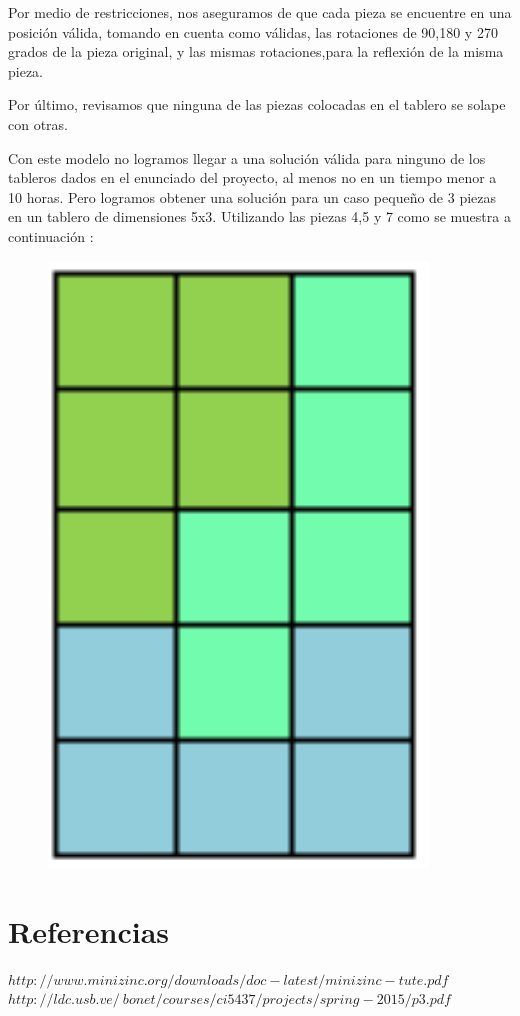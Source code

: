 \documentclass{article}
\begin{document}
Por medio de restricciones, nos aseguramos de que cada pieza se encuentre en una posición válida, tomando en cuenta como válidas, las rotaciones de 90,180 y 270 grados de la pieza original, y las mismas rotaciones,para la reflexión de la misma pieza. \par


Por último, revisamos que ninguna de las piezas colocadas en el tablero se solape con otras. \par

Con este modelo no logramos llegar a una solución válida para ninguno de los tableros dados en el enunciado del proyecto, al menos no en un tiempo menor a 10 horas. Pero logramos obtener una solución para un caso pequeño de 3 piezas en un tablero de dimensiones 5x3. Utilizando las piezas 4,5 y 7 como se muestra a continuación : \par

\begin{figure}[!ht]
\begin{center}
\includegraphics[width=0.9\textwidth]{salida5.png}
\end{center}
\end{figure}



\clearpage

\section{Referencias}


$http://www.minizinc.org/downloads/doc-latest/minizinc-tute.pdf$
$http://ldc.usb.ve/~bonet/courses/ci5437/projects/spring-2015/p3.pdf$
\end{document}
